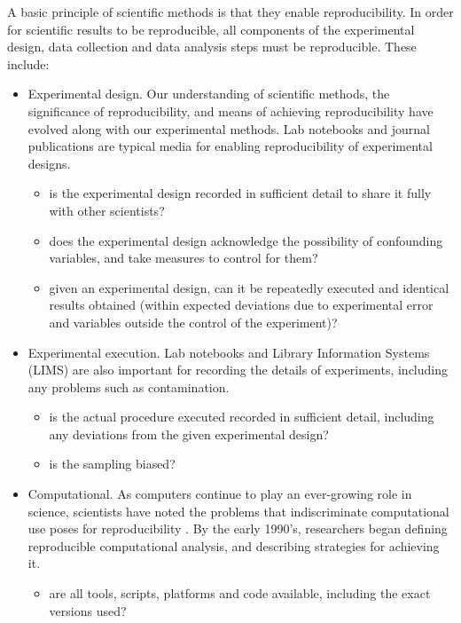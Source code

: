 \documentclass[a4paper]{report}
\begin{document}
A basic principle of scientific methods is that they enable reproducibility.  
In order for scientific results to be reproducible, all components of the 
experimental design, data collection and data analysis steps must be 
reproducible.  These include:
\begin{itemize}
 \item Experimental design.  Our understanding of scientific methods, the 
 significance of reproducibility, and means of achieving reproducibility 
 have evolved along with our experimental methods.  Lab notebooks and journal 
 publications are typical media for enabling reproducibility of experimental 
 designs.  
  \begin{itemize}
     \item is the experimental design recorded in sufficient detail to share 
     it fully with other scientists?
     \item does the experimental design acknowledge the possibility of 
     confounding variables, and take measures to control for them?
     \item given an experimental design, can it be repeatedly executed and 
     identical results obtained (within expected deviations due to experimental 
     error and variables outside the control of the experiment)?
  \end{itemize}
 \item Experimental execution.  Lab notebooks and Library Information Systems 
 (LIMS) are also important for recording the details of experiments, including 
 any problems such as contamination.
  \begin{itemize}
     \item is the actual procedure executed recorded in sufficient detail, 
     including any deviations from the given experimental design?
     \item is the sampling biased?
  \end{itemize}
  \item Computational.  As computers continue to play an ever-growing role in 
  science, scientists have noted the problems that indiscriminate computational 
  use poses for reproducibility \cite{donoho_wavelab, peng2011reproducible}.  
  By the early 
  1990’s, researchers began defining reproducible computational analysis, and 
  describing strategies for achieving it. 
  \begin{itemize}
     \item are all tools, scripts, platforms and code available, including the 
     exact versions used?

\end{itemize}
\end{itemize}
\end{document}
